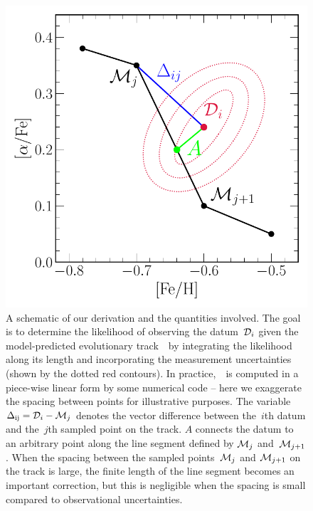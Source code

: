 \documentclass[ms.tex]{subfiles}
\begin{document}
\begin{figure}
\centering
\includegraphics[scale = 0.6]{derivation_cartoon.pdf}
\caption{
A schematic of our derivation and the quantities involved.
The goal is to determine the likelihood of observing the datum~$\mathcal{D}_i$
given the model-predicted evolutionary track~~by integrating the
likelihood along its length and incorporating the measurement uncertainties
(shown by the dotted red contours).
In practice,~~is computed in a piece-wise linear form by some
numerical code -- here we exaggerate the spacing between points for
illustrative purposes.
The variable~$\Delta_\text{ij} = \mathcal{D}_i - \mathcal{M}_j$ denotes the
vector difference between the~$i$th datum and the~$j$th sampled point on the
track.
$A$ connects the datum to an arbitrary point along the line segment defined by
$\mathcal{M}_j$ and~$\mathcal{M}_{j + 1}$.
When the spacing between the sampled points~$\mathcal{M}_j$ and
$\mathcal{M}_{j + 1}$ on the track is large, the finite length of the line
segment becomes an important correction, but this is negligible when the
spacing is small compared to observational uncertainties.
}
\label{fig:marginalization}
\end{figure}
\end{document}
